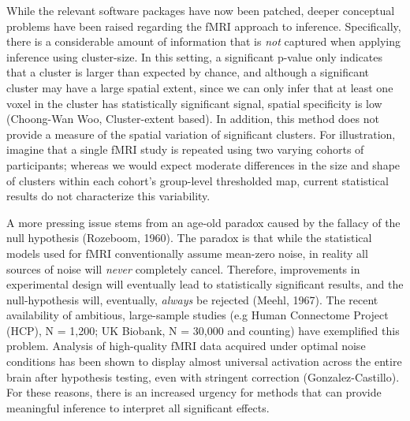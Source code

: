 While the relevant software packages have now been patched, deeper conceptual problems have been raised regarding the fMRI approach to inference. Specifically, there is a considerable amount of information that is \textit{not} captured when applying inference using cluster-size. In this setting, a significant p-value only indicates that a cluster is larger than expected by chance, and although a significant cluster may have a large spatial extent, since we can only infer that at least one voxel in the cluster has statistically significant signal, spatial specificity is low (Choong-Wan Woo, Cluster-extent based). In addition, this method does not provide a measure of the spatial variation of significant clusters. For illustration, imagine that a single fMRI study is repeated using two varying cohorts of participants; whereas we would expect moderate differences in the size and shape of clusters within each cohort's group-level thresholded map, current statistical results do not characterize this variability. 

A more pressing issue stems from an age-old paradox caused by the fallacy of the null hypothesis (Rozeboom, 1960). The paradox is that while the statistical models used for fMRI conventionally assume mean-zero noise, in reality all sources of noise will \textit{never} completely cancel. Therefore, improvements in experimental design will eventually lead to statistically significant results, and the null-hypothesis will, eventually, \textit{always} be rejected (Meehl, 1967). The recent availability of ambitious, large-sample studies (e.g Human Connectome Project (HCP), N = 1,200; UK Biobank, N = 30,000 and counting) have exemplified this problem. Analysis of high-quality fMRI data acquired under optimal noise conditions has been shown to display almost universal activation across the entire brain after hypothesis testing, even with stringent correction (Gonzalez-Castillo). For these reasons, there is an increased urgency for methods that can provide meaningful inference to interpret all significant effects. 

\bigskip


